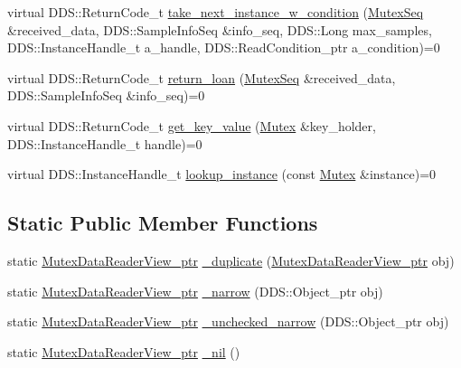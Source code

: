 \begin{DoxyCompactItemize}
\item 
virtual DDS::ReturnCode\_\-t \hyperlink{classKnowledge_1_1MutexDataReaderView_ad3d8ffab06e256e1c132a36ab4bc3f83}{take\_\-next\_\-instance\_\-w\_\-condition} (\hyperlink{namespaceKnowledge_a3165529aa87299c6a92754fbd7eeeff4}{MutexSeq} \&received\_\-data, DDS::SampleInfoSeq \&info\_\-seq, DDS::Long max\_\-samples, DDS::InstanceHandle\_\-t a\_\-handle, DDS::ReadCondition\_\-ptr a\_\-condition)=0
\item 
virtual DDS::ReturnCode\_\-t \hyperlink{classKnowledge_1_1MutexDataReaderView_a97b8e65b22267416edd526267d4d2b4f}{return\_\-loan} (\hyperlink{namespaceKnowledge_a3165529aa87299c6a92754fbd7eeeff4}{MutexSeq} \&received\_\-data, DDS::SampleInfoSeq \&info\_\-seq)=0
\item 
virtual DDS::ReturnCode\_\-t \hyperlink{classKnowledge_1_1MutexDataReaderView_af040a4e537450dfe73da0fd928450b6d}{get\_\-key\_\-value} (\hyperlink{structKnowledge_1_1Mutex}{Mutex} \&key\_\-holder, DDS::InstanceHandle\_\-t handle)=0
\item 
virtual DDS::InstanceHandle\_\-t \hyperlink{classKnowledge_1_1MutexDataReaderView_a542ba6faa6a66f682e0ac6c6707d3f4a}{lookup\_\-instance} (const \hyperlink{structKnowledge_1_1Mutex}{Mutex} \&instance)=0
\end{DoxyCompactItemize}
\subsection*{Static Public Member Functions}
\begin{DoxyCompactItemize}
\item 
static \hyperlink{classKnowledge_1_1MutexDataReaderView}{MutexDataReaderView\_\-ptr} \hyperlink{classKnowledge_1_1MutexDataReaderView_aca7755c70e87b7e9a6299d7559839b69}{\_\-duplicate} (\hyperlink{classKnowledge_1_1MutexDataReaderView}{MutexDataReaderView\_\-ptr} obj)
\item 
static \hyperlink{classKnowledge_1_1MutexDataReaderView}{MutexDataReaderView\_\-ptr} \hyperlink{classKnowledge_1_1MutexDataReaderView_adaf351ff071d6efd6dbf2e012993e54c}{\_\-narrow} (DDS::Object\_\-ptr obj)
\item 
static \hyperlink{classKnowledge_1_1MutexDataReaderView}{MutexDataReaderView\_\-ptr} \hyperlink{classKnowledge_1_1MutexDataReaderView_a9a6a050952005aad67d04ef3d5f0b171}{\_\-unchecked\_\-narrow} (DDS::Object\_\-ptr obj)
\item 
static \hyperlink{classKnowledge_1_1MutexDataReaderView}{MutexDataReaderView\_\-ptr} \hyperlink{classKnowledge_1_1MutexDataReaderView_a3218115ef8ecad204d528343f33274ad}{\_\-nil} ()
\end{DoxyCompactItemize}
